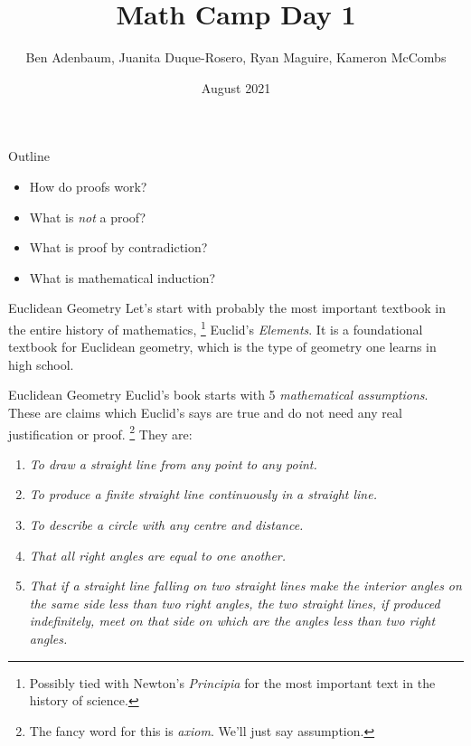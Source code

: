 \documentclass{beamer}
\title{Math Camp Day 1}
\author{Ben Adenbaum, Juanita Duque-Rosero, Ryan Maguire, Kameron McCombs}
\date{August 2021}
\begin{document}
    \maketitle
    \begin{frame}{Outline}
        \begin{itemize}
            \item How do proofs work?
            \item What is \textit{not} a proof?
            \item What is proof by contradiction?
            \item What is mathematical induction?
        \end{itemize}
    \end{frame}
    \begin{frame}{Euclidean Geometry}
        Let's start with probably the most important textbook in the entire history of
        mathematics,%
        \footnote{Possibly tied with Newton's \textit{Principia} for the most important
                  text in the history of science.}
        Euclid's \textit{Elements}. It is a foundational textbook for Euclidean geometry, which
        is the type of geometry one learns in high school.
    \end{frame}
    \begin{frame}{Euclidean Geometry}
        Euclid's book starts with 5 \textit{mathematical assumptions}. These are claims which Euclid's
        says are true and do not need any real justification or proof.%
        \footnote{The fancy word for this is \textit{axiom}. We'll just say assumption.}
        They are:
        \begin{enumerate}
            \item \textit{To draw a straight line from any point}
                  \textit{to any point.}
            \item \textit{To produce a finite straight line continuously in}
                  \textit{a straight line.}
            \item \textit{To describe a circle with any centre and}
                  \textit{distance.}
            \item \textit{That all right angles are equal to one another.}
            \item \textit{That if a straight line falling on two straight}
                  \textit{lines make the interior angles on the same side}
                  \textit{less than two right angles, the two straight}
                  \textit{lines, if produced indefinitely, meet on that}
                  \textit{side on which are the angles less than two right}
                  \textit{angles.}
        \end{enumerate}
    \end{frame}
\end{document}
